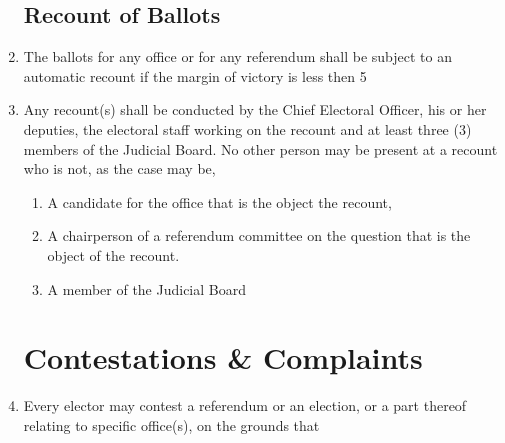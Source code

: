 \documentclass[oneside]{book}
\begin{document}
\begin{enumerate}
\section{\label{Recount_of_Ballots}Recount of Ballots }
\item The ballots for any office or for any referendum shall be subject
to an automatic recount if the margin of victory is less then 5%

\item Any recount(s) shall be conducted by the Chief Electoral Officer,
his or her deputies, the electoral staff working on the recount and
at least three (3) members of the Judicial Board. No other person
may be present at a recount who is not, as the case may be, 

\begin{enumerate}
\item A candidate for the office that is the object the recount, 
\item A chairperson of a referendum committee on the question that is the
object of the recount. 
\item A member of the Judicial Board 
\end{enumerate}
\chapter{\label{Contestations}Contestations \& Complaints}
\item Every elector may contest a referendum or an election, or a part thereof
relating to specific office(s), on the grounds that 


\end{enumerate}
\end{document}
